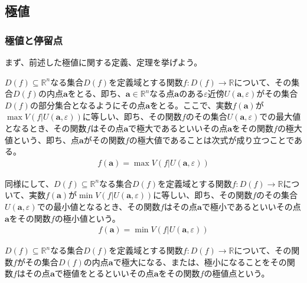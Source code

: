 \documentclass[dvipdfmx]{jsarticle}
\begin{document}
\subsection{極値}%
\subsubsection{極値と停留点}%
まず、前述した極値に関する定義、定理を挙げよう。
\begin{dfn*}
$D(f) \subseteq \mathbb{R}^{n}$なる集合$D(f)$を定義域とする関数$f:D(f) \rightarrow \mathbb{R}$について、その集合$D(f)$の内点$\mathbf{a}$をとる、即ち、$\mathbf{a} \in \mathbb{R}^{n}$なる点$\mathbf{a}$のある$\varepsilon$近傍$U\left( \mathbf{a},\varepsilon \right)$がその集合$D(f)$の部分集合となるようにその点$\mathbf{a}$をとる。ここで、実数$f\left( \mathbf{a} \right)$が$\max{V\left( f|U\left( \mathbf{a},\varepsilon \right) \right)}$に等しい、即ち、その関数$fのその集合U\left( \mathbf{a},\varepsilon \right)$での最大値となるとき、その関数$f$はその点$\mathbf{a}$で極大であるといいその点$\mathbf{a}$をその関数$f$の極大値という、即ち、点$\mathbf{a}$がその関数$f$の極大値であることは次式が成り立つことである。
\begin{align*}
f\left( \mathbf{a} \right) = \max{V\left( f|U\left( \mathbf{a},\varepsilon \right) \right)}
\end{align*}\par
同様にして、$D(f) \subseteq \mathbb{R}^{n}$なる集合$D(f)$を定義域とする関数$f:D(f) \rightarrow \mathbb{R}$について、実数$f\left( \mathbf{a} \right)$が$\min{V\left( f|U\left( \mathbf{a},\varepsilon \right) \right)}$に等しい、即ち、その関数$f$のその集合$U\left( \mathbf{a},\varepsilon \right)$での最小値となるとき、その関数$f$はその点$\mathbf{a}$で極小であるといいその点$\mathbf{a}$をその関数$f$の極小値という。
\begin{align*}
f\left( \mathbf{a} \right) = \min{V\left( f|U\left( \mathbf{a},\varepsilon \right) \right)}
\end{align*}
\end{dfn*}
\begin{dfn*}
$D(f) \subseteq \mathbb{R}^{n}$なる集合$D(f)$を定義域とする関数$f:D(f) \rightarrow \mathbb{R}$について、その関数$f$がその集合$D(f)$の内点$\mathbf{a}$で極大になる、または、極小になることをその関数$f$はその点$\mathbf{a}$で極値をとるといいその点$\mathbf{a}$をその関数$f$の極値点という。
\end{dfn*}
\end{document}
